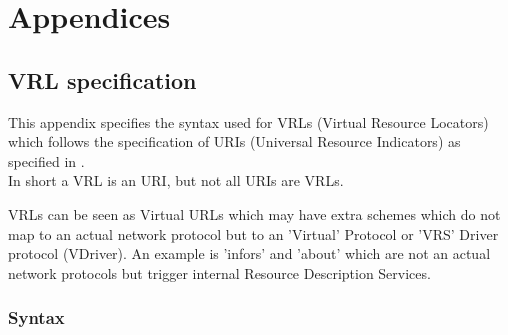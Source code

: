 %
%

\appendix
\chapter{Appendices}
\label{chap:appendices}

\section{VRL specification} 

This appendix specifies the syntax used for VRLs (Virtual Resource Locators)
which follows the specification of URIs (Universal Resource Indicators) as
specified in \cite{bernerslee2005uri}.\\
In short a VRL is an URI, but not all URIs are VRLs.\\
\par
VRLs can be seen as Virtual URLs which may have extra schemes which do not map
to an actual network protocol but to an 'Virtual' Protocol or 'VRS' Driver
protocol (VDriver). An example is 'infors' and 'about' which are not an actual network protocols but trigger
internal Resource Description Services. 

\subsection{Syntax} 


